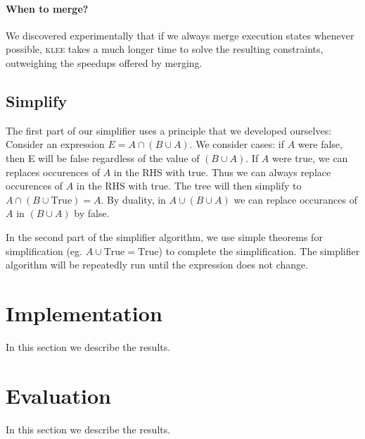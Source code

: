 \documentclass[12pt,a4paper]{article}
\begin{document}
\paragraph{When to merge?}
We discovered experimentally that if we always merge execution states whenever possible, \textsc{klee} takes a much longer time to solve the resulting constraints, outweighing the speedups offered by merging.

\subsection{Simplify}
The first part of our simplifier uses a principle that we developed ourselves:
Consider an expression $E = A\cap(B\cup A)$. We consider cases: if $A$ were false, then E will be false regardless of the value of $(B\cup A)$. If $A$ were true, we can replaces occurences of $A$ in the RHS with true. Thus we can always replace occurences of $A$ in the RHS with true. The tree will then simplify to $A\cap(B\cup \text{True}) = A$. By duality, in $A\cup(B\cup A)$ we can replace occurances of $A$ in $(B\cup A)$ by false.

In the second part of the simplifier algorithm, we use simple theorems for simplification (eg. $A\cup \text{True} = \text{True}$) to complete the simplification. The simplifier algorithm will be repeatedly run until the expression does not change.

\section{Implementation}\label{implementation}
In this section we describe the results.

\section{Evaluation}\label{evaluation}
In this section we describe the results.
\end{document}
